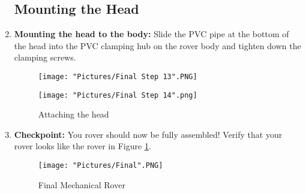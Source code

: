 \documentclass[12pt]{article}
\begin{document}
\begin{enumerate}
\subsection{Mounting the Head}

\item \textbf{Mounting the head to the body:} Slide the PVC pipe at the bottom of the head into the PVC clamping hub on the rover body and tighten down the clamping screws.

\begin{figure}[H]
  \centering
  \begin{minipage}[b]{0.45\textwidth}
    \texttt{[image: "Pictures/Final Step 13".PNG]}
  \end{minipage}
  \hfill
  \begin{minipage}[b]{0.45\textwidth}
    \texttt{[image: "Pictures/Final Step 14".png]}
  \end{minipage}
  \caption{Attaching the head}
\end{figure}

\item \textbf{Checkpoint:} You rover should now be fully assembled!  Verify that your rover looks like the rover in Figure \ref{final mechanical rover}.
\begin{figure}[H]
  \centering
    \texttt{[image: "Pictures/Final".PNG]}
  \caption{Final Mechanical Rover}
  \label{final mechanical rover}
\end{figure}

\end{enumerate}
\end{document}
